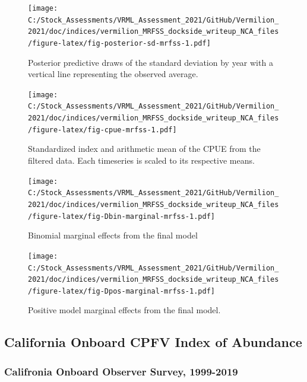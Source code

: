 \documentclass[
  english,
  a4paper,
]{article}
\begin{document}
\begin{figure}
\centering
\texttt{[image: C:/Stock\_Assessments/VRML\_Assessment\_2021/GitHub/Vermilion\_2021/doc/indices/vermilion\_MRFSS\_dockside\_writeup\_NCA\_files/figure-latex/fig-posterior-sd-mrfss-1.pdf]}
\caption{\label{fig:fig-posterior-sd-mrfss}Posterior predictive draws of the standard deviation by year with a vertical line representing the observed average.}
\end{figure}

\begin{figure}
\centering
\texttt{[image: C:/Stock\_Assessments/VRML\_Assessment\_2021/GitHub/Vermilion\_2021/doc/indices/vermilion\_MRFSS\_dockside\_writeup\_NCA\_files/figure-latex/fig-cpue-mrfss-1.pdf]}
\caption{\label{fig:fig-cpue-mrfss}Standardized index and arithmetic mean of the CPUE from the filtered data. Each timeseries is scaled to its respective means.}
\end{figure}

\begin{figure}
\centering
\texttt{[image: C:/Stock\_Assessments/VRML\_Assessment\_2021/GitHub/Vermilion\_2021/doc/indices/vermilion\_MRFSS\_dockside\_writeup\_NCA\_files/figure-latex/fig-Dbin-marginal-mrfss-1.pdf]}
\caption{\label{fig:fig-Dbin-marginal-mrfss}Binomial marginal effects from the final model}
\end{figure}

\begin{figure}
\centering
\texttt{[image: C:/Stock\_Assessments/VRML\_Assessment\_2021/GitHub/Vermilion\_2021/doc/indices/vermilion\_MRFSS\_dockside\_writeup\_NCA\_files/figure-latex/fig-Dpos-marginal-mrfss-1.pdf]}
\caption{\label{fig:fig-Dpos-marginal-mrfss}Positive model marginal effects from the final model.}
\end{figure}

\clearpage

\hypertarget{california-onboard-cpfv-index-of-abundance}{%
\subsection{California Onboard CPFV Index of Abundance}\label{california-onboard-cpfv-index-of-abundance}}

\hypertarget{califronia-onboard-observer-survey-1999-2019}{%
\subsubsection{Califronia Onboard Observer Survey, 1999-2019}\label{califronia-onboard-observer-survey-1999-2019}}
\end{document}
